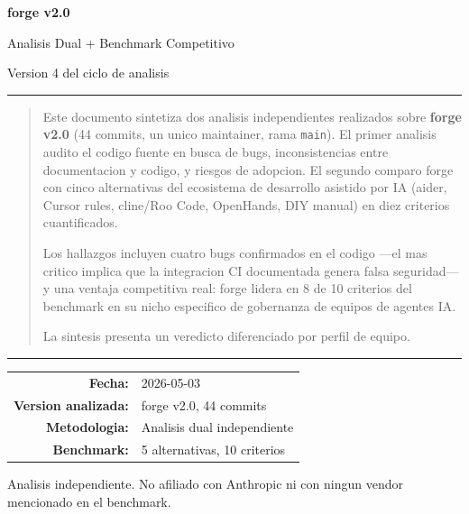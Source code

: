 \documentclass[12pt,a4paper]{article}
\begin{document}
\begin{titlepage}
  \centering
  \vspace*{2cm}
  {\fontsize{28}{34}\selectfont\bfseries\color{titlegray} forge v2.0}\par
  \vspace{0.5cm}
  {\fontsize{18}{22}\selectfont\color{accentblue} Analisis Dual + Benchmark Competitivo}\par
  \vspace{0.3cm}
  {\large\color{titlegray} Version 4 del ciclo de analisis}\par
  \vspace{2cm}
  \hrule height 1pt
  \vspace{0.5cm}

  \begin{abstract}
    \noindent
    Este documento sintetiza dos analisis independientes realizados sobre
    \textbf{forge v2.0} (44 commits, un unico maintainer, rama \texttt{main}).
    El primer analisis audito el codigo fuente en busca de bugs, inconsistencias
    entre documentacion y codigo, y riesgos de adopcion. El segundo comparo forge
    con cinco alternativas del ecosistema de desarrollo asistido por IA
    (aider, Cursor rules, cline/Roo Code, OpenHands, DIY manual) en diez criterios
    cuantificados.

    Los hallazgos incluyen cuatro bugs confirmados en el codigo ---el mas critico
    implica que la integracion CI documentada genera falsa seguridad--- y una
    ventaja competitiva real: forge lidera en 8 de 10 criterios del benchmark
    en su nicho especifico de gobernanza de equipos de agentes IA.

    La sintesis presenta un veredicto diferenciado por perfil de equipo.
  \end{abstract}

  \vspace{0.5cm}
  \hrule height 1pt
  \vspace{2cm}

  \begin{tabular}{rl}
    \textbf{Fecha:} & 2026-05-03 \\
    \textbf{Version analizada:} & forge v2.0, 44 commits \\
    \textbf{Metodologia:} & Analisis dual independiente \\
    \textbf{Benchmark:} & 5 alternativas, 10 criterios \\
  \end{tabular}

  \vfill
  {\small\color{titlegray} Analisis independiente. No afiliado con Anthropic ni con
  ningun vendor mencionado en el benchmark.}
\end{titlepage}
\end{document}
